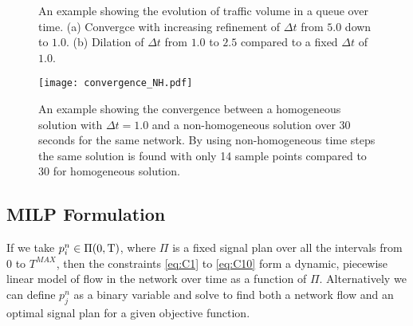 
\begin{figure*}[t!]
\centering
\caption{An example showing the evolution of traffic volume in a queue over time. (a) Convergce with increasing refinement of $\Delta t$ from $5.0$ down to $1.0$. (b) Dilation of $\Delta t$ from $1.0$ to $2.5$ compared to a fixed $\Delta t$ of $1.0$.}

\end{figure*}

\begin{figure*}[t!]
\centering

\label{subfig:converg_c}
\texttt{[image: convergence\_NH.pdf]}
\caption{An example showing the convergence between a homogeneous solution with $\Delta t=1.0$ and a non-homogeneous solution over 30 seconds for the same network. By using non-homogeneous time steps the same solution is found with only 14 sample points compared to 30 for homogeneous solution.}

\end{figure*}

\subsection{MILP Formulation}
If we take $p_i^n \in \Pi(0,\mathrm{T})$, where $\Pi$ is a fixed signal plan over all the intervals from 0 to $T^{MAX}$, then the constraints \ref{eq:C1} to \ref{eq:C10} form a dynamic, piecewise linear model of flow in the network over time as a function of $\Pi$. Alternatively we can define $p_j^n$ as a binary variable and solve to find both a network flow and an optimal signal plan for a given objective function.


